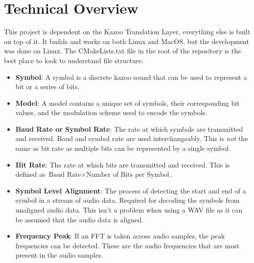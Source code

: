 \documentclass[]{article}
\begin{document}
\section{Technical Overview}



This project is dependent on the Kazoo Translation Layer, everything else is built on top of it. It builds and works on both Linux and MacOS, but the development was done on Linux. The CMakeLists.txt file in the root of the repository is the best place to look to understand file structure.

\begin{itemize}
  \item \textbf{Symbol}: A symbol is a discrete kazoo sound that can be used to represent a bit or a series of bits.
  \item \textbf{Model}: A model contains a unique set of symbols, their corresponding bit values, and the modulation scheme used to encode the symbols.
  \item \textbf{Baud Rate or Symbol Rate}: The rate at which symbols are transmitted and received. Baud and symbol rate are used interchangeably. This is \textit{not} the same as bit rate as multiple bits can be represented by a single symbol.
  \item \textbf{Bit Rate}: The rate at which bits are transmitted and received. This is defined as $\text{Baud Rate} \times \text{Number of Bits per Symbol}$.
  \item \textbf{Symbol Level Alignment}: The process of detecting the start and end of a symbol in a stream of audio data. Required for decoding the symbols from unaligned audio data. This isn't a problem when using a WAV file as it can be assumed that the audio data is aligned.
  \item \textbf{Frequency Peak}: If an FFT is taken across audio samples, the peak frequencies can be detected. These are the audio frequencies that are most present in the audio samples.
\end{itemize}
\end{document}
